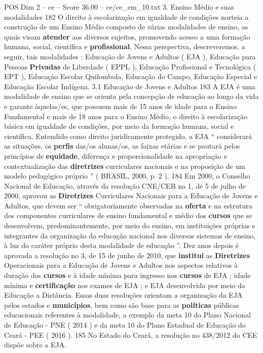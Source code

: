 \begin{textsample}{POS Dim 2 – ce – Score 36.00 – ce/ce\_em\_10.txt}  \label{ex:f2_pos_082}
3.
Ensino Médio e suas modalidades 182 O direito à escolarização em igualdade de condições norteia a construção de um Ensino Médio composto de várias modalidades de ensino, as quais visam \textbf{atender} aos diversos sujeitos, promovendo acesso a uma formação humana, social, científica e \textbf{profissional}.
Nessa perspectiva, descreveremos, a seguir, tais modalidades : Educação de Jovens e Adultos ( EJA ), Educação para Pessoas \textbf{Privadas} de Liberdade ( EPPL ), Educação Profissional e Tecnológica ( EPT ), Educação Escolar Quilombola, Educação do Campo, Educação Especial e Educação Escolar Indígena. 3.1 Educação de Jovens e Adultos 183 A EJA é uma modalidade de ensino que se orienta pela concepção de educação ao longo da vida e garante àquelas/es, que possuem mais de 15 anos de idade para o Ensino Fundamental e mais de 18 anos para o Ensino Médio, o direito à escolarização básica em igualdade de condições, por meio da formação humana, social e científica.
Entendido como direito juridicamente protegido, a EJA “ considerará as situações, os \textbf{perfis} das/os alunas/os, as faixas etárias e se pautará pelos princípios de \textbf{equidade}, diferença e proporcionalidade na apropriação e contextualização das \textbf{diretrizes} curriculares nacionais e na proposição de um modelo pedagógico próprio ” ( BRASIL, 2000, p. 2 ). 184 Em 2000, o Conselho Nacional de Educação, através da resolução CNE/CEB no 1, de 5 de julho de 2000, aprovou as \textbf{Diretrizes} Curriculares Nacionais para a Educação de Jovens e Adultos, que devem ser “ obrigatoriamente observadas na \textbf{oferta} e na estrutura dos componentes curriculares de ensino fundamental e médio dos \textbf{cursos} que se desenvolvem, predominantemente, por meio do ensino, em instituições próprias e integrantes da organização da educação nacional nos diversos sistemas de ensino, à luz do caráter próprio desta modalidade de educação ”.
Dez anos depois é aprovada a resolução no 3, de 15 de junho de 2010, que \textbf{institui} as \textbf{Diretrizes} Operacionais para a Educação de Jovens e Adultos nos aspectos relativos à duração dos \textbf{cursos} e à idade mínima para ingresso nos \textbf{cursos} de EJA ; idade mínima e \textbf{certificação} nos exames de EJA ; e EJA desenvolvida por meio da Educação a Distância.
Essas duas resoluções orientam a organização da EJA pelos estados e \textbf{municípios}, bem como são base para as \textbf{políticas} públicas educacionais referentes à modalidade, a exemplo da meta 10 do Plano Nacional de Educação - PNE ( 2014 ) e da meta 10 do Plano Estadual de Educação do Ceará - PEE ( 2016 ). 185 No Estado do Ceará, a resolução no 438/2012 do CEE dispõe sobre a EJA.

\end{textsample}
